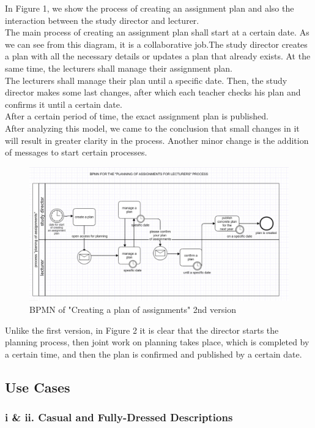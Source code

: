 \documentclass{scrartcl}
\begin{document}
In Figure 1, we show the process of creating an assignment plan and also the interaction between the study director and lecturer. \\
The main process of creating an assignment plan shall start at a certain date. As we can see from this diagram, it is a collaborative job.The study director creates a plan with all the necessary details or updates a plan that already exists. At the same time, the lecturers shall manage their assignment plan. \\
The lecturers shall manage their plan until a specific date. Then, the study director makes some last changes, after which each teacher checks his plan and confirms it until a certain date.\\
After a certain period of time, the exact assignment plan is published.
\\
After analyzing this model, we came to the conclusion that small changes in it will result in greater clarity in the process. Another minor change is the addition of messages to start certain processes.
 
 \begin{figure}[h]
\centering
\includegraphics[width=150mm]{uml/bpmn2.JPG}
\caption{BPMN of "Creating a plan of assignments" 2nd version}
\label{blabla}
\end{figure}

Unlike the first version, in Figure 2 it is clear that the director starts the planning process, then joint work on planning takes place, which is completed by a certain time, and then the plan is confirmed and published by a certain date. 


  	\subsection{Use Cases}
  	\subsubsection{ i \& ii. Casual and Fully-Dressed Descriptions}
  	
\end{document}
